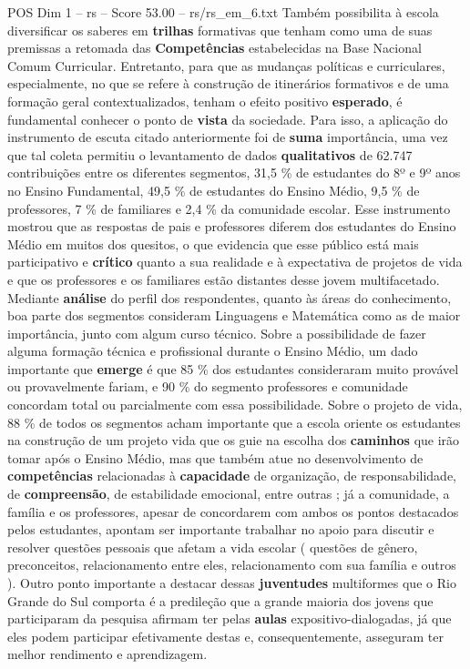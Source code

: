 \begin{textsample}{POS Dim 1 – rs – Score 53.00 – rs/rs\_em\_6.txt}
Também possibilita à escola diversificar os saberes em \textbf{trilhas} formativas que tenham como uma de suas premissas a retomada das \textbf{Competências} estabelecidas na Base Nacional Comum Curricular.
Entretanto, para que as mudanças políticas e curriculares, especialmente, no que se refere à construção de itinerários formativos e de uma formação geral contextualizados, tenham o efeito positivo \textbf{esperado}, é fundamental conhecer o ponto de \textbf{vista} da sociedade.
Para isso, a aplicação do instrumento de escuta citado anteriormente foi de \textbf{suma} importância, uma vez que tal coleta permitiu o levantamento de dados \textbf{qualitativos} de 62.747 contribuições entre os diferentes segmentos, 31,5 \% de estudantes do 8º e 9º anos no Ensino Fundamental, 49,5 \% de estudantes do Ensino Médio, 9,5 \% de professores, 7 \% de familiares e 2,4 \% da comunidade escolar.
Esse instrumento mostrou que as respostas de pais e professores diferem dos estudantes do Ensino Médio em muitos dos quesitos, o que evidencia que esse público está mais participativo e \textbf{crítico} quanto a sua realidade e à expectativa de projetos de vida e que os professores e os familiares estão distantes desse jovem multifacetado.
Mediante \textbf{análise} do perfil dos respondentes, quanto às áreas do conhecimento, boa parte dos segmentos consideram Linguagens e Matemática como as de maior importância, junto com algum curso técnico.
Sobre a possibilidade de fazer alguma formação técnica e profissional durante o Ensino Médio, um dado importante que \textbf{emerge} é que 85 \% dos estudantes consideraram muito provável ou provavelmente fariam, e 90 \% do segmento professores e comunidade concordam total ou parcialmente com essa possibilidade.
Sobre o projeto de vida, 88 \% de todos os segmentos acham importante que a escola oriente os estudantes na construção de um projeto vida que os guie na escolha dos \textbf{caminhos} que irão tomar após o Ensino Médio, mas que também atue no desenvolvimento de \textbf{competências} relacionadas à \textbf{capacidade} de organização, de responsabilidade, de \textbf{compreensão}, de estabilidade emocional, entre outras ; já a comunidade, a família e os professores, apesar de concordarem com ambos os pontos destacados pelos estudantes, apontam ser importante trabalhar no apoio para discutir e resolver questões pessoais que afetam a vida escolar ( questões de gênero, preconceitos, relacionamento entre eles, relacionamento com sua família e outros ).
Outro ponto importante a destacar dessas \textbf{juventudes} multiformes que o Rio Grande do Sul comporta é a predileção que a grande maioria dos jovens que participaram da pesquisa afirmam ter pelas \textbf{aulas} expositivo-dialogadas, já que eles podem participar efetivamente destas e, consequentemente, asseguram ter melhor rendimento e aprendizagem.

\end{textsample}
